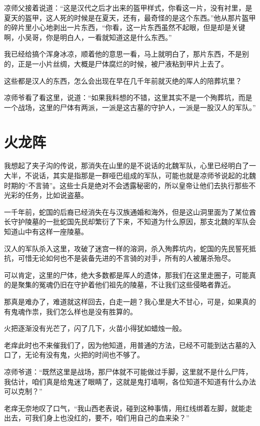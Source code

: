 凉师父接着说道：“这是汉代之后才出来的盔甲样式，你看这一片，没有衬里，是夏天的盔甲，这人死的时候是在夏天，还有，最奇怪的是这个东西。”他从那片盔甲的碎片里小心地剥出一片东西，“你看，这一片东西虽然不起眼，但是却是关键啊，小吴哥，你是明白人，一看就知道这是什么东西。”

我已经给搞个浑身冰凉，顺着他的意思一看，马上就明白了，那片东西，不是别的，正是一小片丝绸，大概是尸体腐烂的时候，被尸液粘到甲片上去了。

这些都是汉人的东西，怎么会出现在早在几千年前就灭绝的厍人的陪葬坑里？

凉师爷看了看这里，说道：“如果我料想的不错，这里其实不是一个殉葬坑，而是一个战场，这里的尸体有两派，一派是这古墓的守护人，一派是一股汉人的军队。”

\chapter{火龙阵}

我想起了夹子沟的传说，那消失在山里的是不说话的北魏军队，心里已经明白了一大半，不说话，其实是指那是一群哑巴组成的军队，可能也就是凉师爷说起的北魏时期的“不言骑”。这些士兵是绝对不会透露秘密的，所以皇帝让他们去执行那些不光彩的任务，比如说盗墓。

一千年前，蛇国的后裔已经消失在与汉族通婚和海外，但是这山洞里面为了某位酋长守护陵墓的一批蛇国先民却繁衍了下来，不知道为什么原因，那支北魏的军队会知道山中有这样一座陵墓。

汉人的军队杀入这里，攻破了迷宫一样的溶洞，杀入殉葬坑内，蛇国的先民誓死抵抗，可惜无论如何也不是装备先进的不言骑的对手，所有的人被屠杀殆尽。

可以肯定，这里的尸体，绝大多数都是厍人的遗体，那我们在这里走圈子，可能真的是聚集的冤魂仍旧在守护着他们祖先的陵墓，不让我们这些侵略者靠近。

那真是难办了，难道就这样回去，白走一趟？我心里是大不甘心，可是，如果真的有鬼魂作祟，我们怎么样也是没有胜算的。

火把逐渐没有光芒了，闪了几下，火苗小得犹如蜡烛一般。

老痒此时也不来催我们了，因为他知道，用普通的方法，已经不可能到达古墓的入口了，无论有没有鬼，火把的时间也不够了。

凉师爷道：“既然这里是战场，那尸体就不可能做过手脚，这里就不是什么尸阵，我估计，咱们真是给鬼迷了眼睛了，这就是鬼打墙啊，各位知道不知道有什么办法可以克制？”

老痒无奈地叹了口气，“我山西老表说，碰到这种事情，用红线绑着左脚，就能走出去，可我们身上也没红的，要不，咱们用自己的血来染？”

